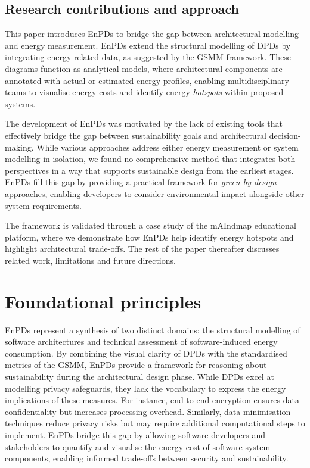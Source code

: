 \documentclass[11pt,a4paper]{article}
\begin{document}
\subsection{Research contributions and approach}
This paper introduces EnPDs to bridge the gap between architectural modelling and energy measurement.
EnPDs extend the structural modelling of DPDs by integrating energy-related data, as suggested by the GSMM framework.
These diagrams function as analytical models, where architectural components are annotated with actual or estimated energy profiles, enabling multidisciplinary teams to visualise energy costs and identify energy \emph{hotspots} within proposed systems.

The development of EnPDs was motivated by the lack of existing tools that effectively bridge the gap between sustainability goals and architectural decision-making.
While various approaches address either energy measurement or system modelling in isolation, we found no comprehensive method that integrates both perspectives in a way that supports sustainable design from the earliest stages.
EnPDs fill this gap by providing a practical framework for \emph{green by design} approaches, enabling developers to consider environmental impact alongside other system requirements.

The framework is validated through a case study of the mAIndmap educational platform, where we demonstrate how EnPDs help identify energy hotspots and highlight architectural trade-offs.
The rest of the paper thereafter discusses related work, limitations and future directions.

\section{Foundational principles}
EnPDs represent a synthesis of two distinct domains: the structural modelling of software architectures and technical assessment of software-induced energy consumption.
By combining the visual clarity of DPDs with the standardised metrics of the GSMM, EnPDs provide a framework for reasoning about sustainability during the architectural design phase.
While DPDs excel at modelling privacy safeguards, they lack the vocabulary to express the energy implications of these measures.
For instance, end-to-end encryption ensures data confidentiality but increases processing overhead.
Similarly, data minimisation techniques reduce privacy risks but may require additional computational steps to implement.
EnPDs bridge this gap by allowing software developers and stakeholders to quantify and visualise the energy cost of software system components, enabling informed trade-offs between security and sustainability.
\end{document}
